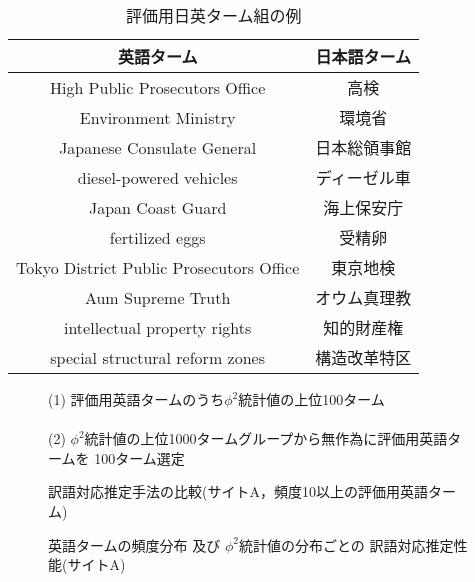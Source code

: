 {
\begin{table}
\begin{center}
 \caption{評価用日英ターム組の例}
 \label{tab:ex}
 \begin{tabular}{|c|c|} \hline
  英語ターム & 日本語ターム \\
  \hline\hline
  High Public Prosecutors Office & 高検 \\ \hline
  Environment Ministry & 環境省 \\ \hline
  Japanese Consulate General & 日本総領事館 \\ \hline
  diesel-powered vehicles & ディーゼル車 \\ \hline
  Japan Coast Guard & 海上保安庁 \\ \hline
  fertilized eggs & 受精卵 \\ \hline
  Tokyo District Public Prosecutors Office & 東京地検 \\ \hline
  Aum Supreme Truth & オウム真理教 \\ \hline
  intellectual property rights & 知的財産権 \\ \hline
  special structural reform zones & 構造改革特区 \\ \hline
 \end{tabular}
\end{center}
\end{table}
}


\begin{figure}
\begin{minipage}{1\hsize}
\begin{center}
(1) 評価用英語タームのうち$\phi^2$統計値の上位100ターム\\[-.3cm]
 \\

(2) $\phi^2$統計値の上位1000タームグループから無作為に評価用英語タームを
 100ターム選定\\[-.3cm]
\end{center}
\caption{訳語対応推定手法の比較(サイトA，頻度10以上の評価用英語ターム)}
\label{fig:graph-cv-phi}
\end{minipage}
\end{figure}



\begin{figure}[t]
\begin{minipage}{1\hsize}
\begin{center}


\end{center}
\caption{英語タームの頻度分布 及び $\phi^2統計値の分布$ごとの
        訳語対応推定性能(サイトA)}
\label{fig:graph-A}
\end{minipage}
\end{figure}

